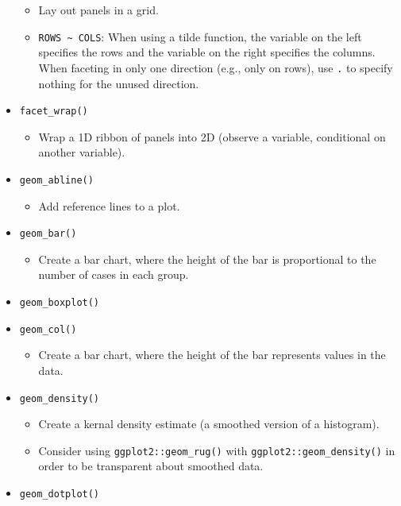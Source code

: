 \documentclass[
]{book}
\providecommand{\tightlist}{%
  \setlength{\itemsep}{0pt}\setlength{\parskip}{0pt}}
\begin{document}
\begin{itemize}
  \begin{itemize}
  \tightlist
  \item
    Lay out panels in a grid.
  \item
    \texttt{ROWS\ \textasciitilde{}\ COLS}: When using a tilde function, the variable on the left specifies the rows and the variable on the right specifies the columns. When faceting in only one direction (e.g., only on rows), use \texttt{.} to specify nothing for the unused direction.
  \end{itemize}
\item
  \texttt{facet\_wrap()}

  \begin{itemize}
  \tightlist
  \item
    Wrap a 1D ribbon of panels into 2D (observe a variable, conditional on another variable).
  \end{itemize}
\item
  \texttt{geom\_abline()}

  \begin{itemize}
  \tightlist
  \item
    Add reference lines to a plot.
  \end{itemize}
\item
  \texttt{geom\_bar()}

  \begin{itemize}
  \tightlist
  \item
    Create a bar chart, where the height of the bar is proportional to the number of cases in each group.
  \end{itemize}
\item
  \texttt{geom\_boxplot()}
\item
  \texttt{geom\_col()}

  \begin{itemize}
  \tightlist
  \item
    Create a bar chart, where the height of the bar represents values in the data.
  \end{itemize}
\item
  \texttt{geom\_density()}

  \begin{itemize}
  \tightlist
  \item
    Create a kernal density estimate (a smoothed version of a histogram).
  \item
    Consider using \texttt{ggplot2::geom\_rug()} with \texttt{ggplot2::geom\_density()} in order to be transparent about smoothed data.
  \end{itemize}
\item
  \texttt{geom\_dotplot()}


\end{itemize}
\end{document}
